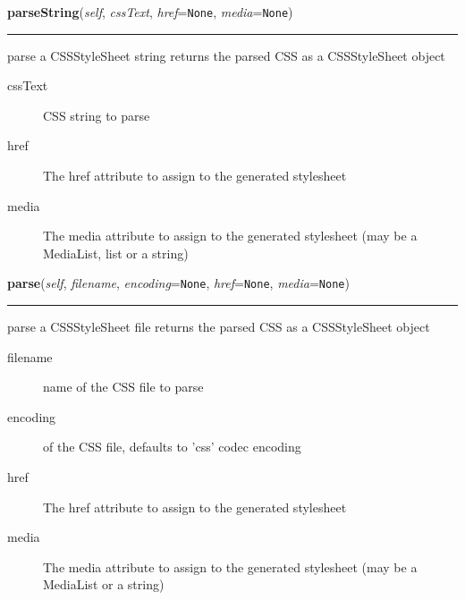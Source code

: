 \hspace{.8\funcindent}\begin{boxedminipage}{\funcwidth}

    \raggedright \textbf{parseString}(\textit{self}, \textit{cssText}, \textit{href}={\tt None}, \textit{media}={\tt None})

    \vspace{-1.5ex}

    \rule{\textwidth}{0.5\fboxrule}
\setlength{\parskip}{2ex}

parse a CSSStyleSheet string
returns the parsed CSS as a CSSStyleSheet object
\begin{description}
\item[{cssText}] \leavevmode 
CSS string to parse

\item[{href}] \leavevmode 
The href attribute to assign to the generated stylesheet

\item[{media}] \leavevmode 
The media attribute to assign to the generated stylesheet
(may be a MediaList, list or a string)

\end{description}
\setlength{\parskip}{1ex}
    \end{boxedminipage}

    \label{cssutils:parse':CSSParser:parse}

    \vspace{0.5ex}

\hspace{.8\funcindent}\begin{boxedminipage}{\funcwidth}

    \raggedright \textbf{parse}(\textit{self}, \textit{filename}, \textit{encoding}={\tt None}, \textit{href}={\tt None}, \textit{media}={\tt None})

    \vspace{-1.5ex}

    \rule{\textwidth}{0.5\fboxrule}
\setlength{\parskip}{2ex}

parse a CSSStyleSheet file
returns the parsed CSS as a CSSStyleSheet object
\begin{description}
\item[{filename}] \leavevmode 
name of the CSS file to parse

\item[{encoding}] \leavevmode 
of the CSS file, defaults to 'css' codec encoding

\item[{href}] \leavevmode 
The href attribute to assign to the generated stylesheet

\item[{media}] \leavevmode 
The media attribute to assign to the generated stylesheet
(may be a MediaList or a string)

\end{description}
\setlength{\parskip}{1ex}
    \end{boxedminipage}


